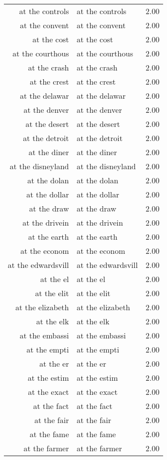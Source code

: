 \begin{table}[ht]
\begin{tabular}{rlr}
  at the controls & at the controls & 2.00 \\ 
  at the convent & at the convent & 2.00 \\ 
  at the cost & at the cost & 2.00 \\ 
  at the courthous & at the courthous & 2.00 \\ 
  at the crash & at the crash & 2.00 \\ 
  at the crest & at the crest & 2.00 \\ 
  at the delawar & at the delawar & 2.00 \\ 
  at the denver & at the denver & 2.00 \\ 
  at the desert & at the desert & 2.00 \\ 
  at the detroit & at the detroit & 2.00 \\ 
  at the diner & at the diner & 2.00 \\ 
  at the disneyland & at the disneyland & 2.00 \\ 
  at the dolan & at the dolan & 2.00 \\ 
  at the dollar & at the dollar & 2.00 \\ 
  at the draw & at the draw & 2.00 \\ 
  at the drivein & at the drivein & 2.00 \\ 
  at the earth & at the earth & 2.00 \\ 
  at the econom & at the econom & 2.00 \\ 
  at the edwardsvill & at the edwardsvill & 2.00 \\ 
  at the el & at the el & 2.00 \\ 
  at the elit & at the elit & 2.00 \\ 
  at the elizabeth & at the elizabeth & 2.00 \\ 
  at the elk & at the elk & 2.00 \\ 
  at the embassi & at the embassi & 2.00 \\ 
  at the empti & at the empti & 2.00 \\ 
  at the er & at the er & 2.00 \\ 
  at the estim & at the estim & 2.00 \\ 
  at the exact & at the exact & 2.00 \\ 
  at the fact & at the fact & 2.00 \\ 
  at the fair & at the fair & 2.00 \\ 
  at the fame & at the fame & 2.00 \\ 
  at the farmer & at the farmer & 2.00 \\ 

\end{tabular}
\end{table}
